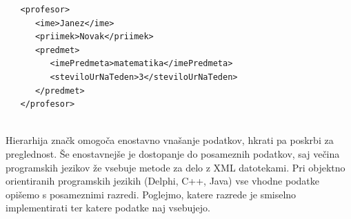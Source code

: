 \documentclass[a4paper]{article}
\begin{document}
\begin{verbatim}
   <profesor>
      <ime>Janez</ime>
      <priimek>Novak</priimek>
      <predmet>
         <imePredmeta>matematika</imePredmeta>
         <steviloUrNaTeden>3</steviloUrNaTeden>
      </predmet>
   </profesor>
   
\end{verbatim}
%
Hierarhija značk omogoča enostavno vnašanje podatkov, hkrati pa poskrbi za preglednost.
Še enostavnejše je dostopanje do posameznih podatkov, saj večina programskih jezikov že
vsebuje metode za delo z XML datotekami.
%
Pri objektno orientiranih programskih jezikih (Delphi, C++, Java) vse vhodne podatke
opišemo s posameznimi razredi. Poglejmo, katere razrede je smiselno implementirati ter
katere podatke naj vsebujejo.
%

\end{document}
